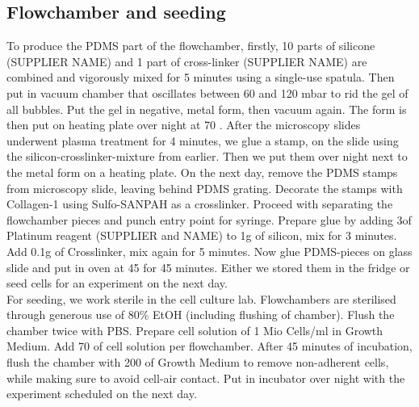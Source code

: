 \subsection{Flowchamber and seeding}
\label{sec:FluidicModel}
To produce the PDMS part of the flowchamber, firstly, 10 parts of silicone (SUPPLIER NAME) and 1 part of cross-linker (SUPPLIER NAME) are combined and vigorously mixed for 5 minutes using a single-use spatula. Then put in vacuum chamber that oscillates between 60 and 120 mbar to rid the gel of all bubbles. Put the gel in negative, metal form, then vacuum again. The form is then put on heating plate over night at 70 \degC{}. After the microscopy slides underwent plasma treatment for 4 minutes, we glue a stamp, on the slide using the silicon-crosslinker-mixture from earlier. Then we put them over night next to the metal form on a heating plate. On the next day, remove the PDMS stamps from microscopy slide, leaving behind PDMS grating. Decorate the stamps with Collagen-1 using Sulfo-SANPAH as a crosslinker. Proceed with separating the flowchamber pieces and punch entry point for syringe. Prepare glue by adding 3\mul of Platinum reagent (SUPPLIER and NAME) to 1g of silicon, mix for 3 minutes. Add 0.1g of Crosslinker, mix again for 5 minutes. Now glue PDMS-pieces on glass slide and put in oven at 45 \degC{} for 45 minutes. Either we stored them in the fridge or seed cells for an experiment on the next day.\\
For seeding, we work sterile in the cell culture lab. Flowchambers are sterilised through generous use of 80\% EtOH (including flushing of chamber). Flush the chamber twice with PBS. Prepare cell solution of 1 Mio Cells/ml in Growth Medium. Add 70 \mul{} of cell solution per flowchamber. After 45 minutes of incubation, flush the chamber with 200\mul{} of Growth Medium to remove non-adherent cells, while making sure to avoid cell-air contact. Put in incubator over night with the experiment scheduled on the next day.

